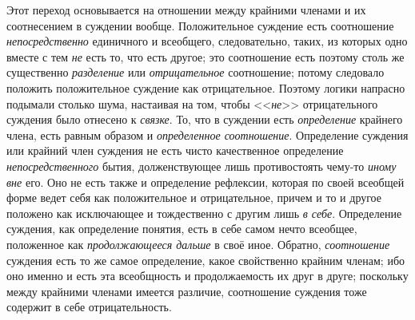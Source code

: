 {Этот переход основывается на отношении между крайними членами
и их соотнесением в суждении вообще. Положительное суждение есть
соотношение {\em непосредственно}
единичного и всеобщего, следовательно, таких,
из которых одно вместе с тем {\em не}
есть то, что есть другое; это соотношение есть поэтому столь
же существенно {\em разделение}
или {\em отрицательное}
соотношение; потому следовало положить положительное суждение
как отрицательное. Поэтому логики напрасно подымали столько шума, настаивая
на том, чтобы <<{\em не}>>
отрицательного суждения было отнесено к
{\em связке}. То, что в
суждении есть {\em определение}
крайнего члена, есть равным образом и
{\em определенное соотношение}.
Определение суждения или крайний член суждения не есть чисто
качественное определение
{\em непосредственного}
бытия, долженствующее лишь противостоять чему-то
{\em иному вне} его.
Оно не есть также и определение рефлексии, которая по своей всеобщей форме
ведет себя как положительное и отрицательное, причем и то и другое положено
как исключающее и тождественно с другим лишь
{\em в себе}. Определение
суждения, как определение понятия, есть в себе самом нечто всеобщее,
положенное как {\em продолжающееся
дальше} в своё иное. Обратно,
{\em соотношение}
суждения есть то же самое определение, какое свойственно
крайним членам; ибо оно именно и есть эта всеобщность и продолжаемость их
друг в друге; поскольку между крайними членами имеется различие,
соотношение суждения тоже содержит в себе отрицательность.

}

